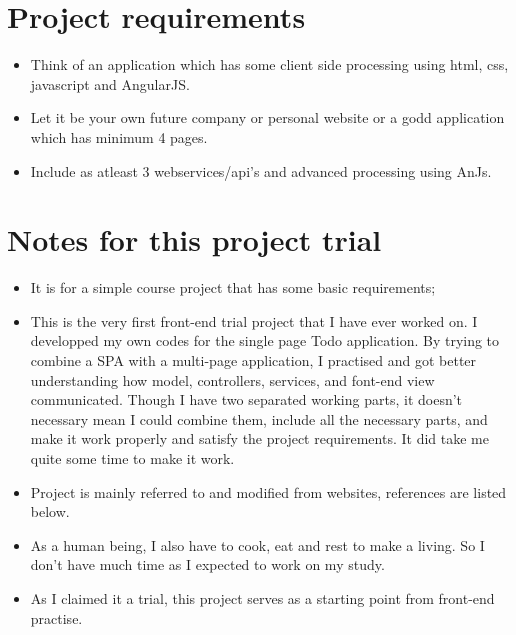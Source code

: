 \documentclass[9pt,b5paper]{article}
\begin{document}
\section{Project requirements}
\label{sec-8}
\begin{itemize}
\item Think of an application which has some client side processing using html, css, javascript and AngularJS.
\item Let it be your own future company or personal website or a godd application which has minimum 4 pages.
\item Include as atleast 3 webservices/api's and advanced processing using AnJs.
\end{itemize}

\section{Notes for this project trial}
\label{sec-9}
\begin{itemize}
\item It is for a simple course project that has some basic requirements;
\item This is the very first front-end trial project that I have ever worked on. I developped my own codes for the single page Todo application. By trying to combine a SPA with a multi-page application, I practised and got better understanding how model, controllers, services, and font-end view communicated. Though I have two separated working parts, it doesn't necessary mean I could combine them, include all the necessary parts, and make it work properly and satisfy the project requirements. It did take me quite some time to make it work.
\item Project is mainly referred to and modified from websites, references are listed below.
\item As a human being, I also have to cook, eat and rest to make a living. So I don't have much time as I expected to work on my study.
\item As I claimed it a trial, this project serves as a starting point from front-end practise.
\end{itemize}
\end{document}
